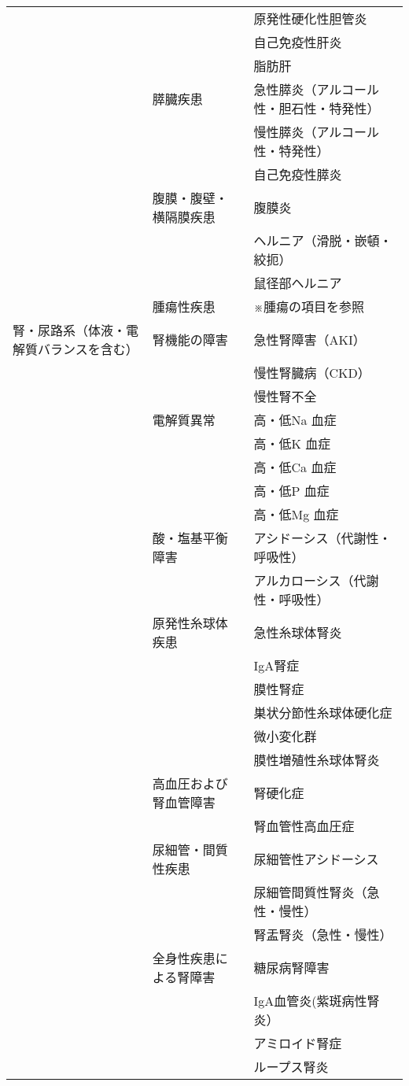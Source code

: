 \begin{xltabular}{\linewidth}{XXXX}
 &  &  & 原発性硬化性胆管炎 \\
 &  &  & 自己免疫性肝炎 \\
 &  &  & 脂肪肝 \\
 & 膵臓疾患 &  & 急性膵炎（アルコール性・胆石性・特発性） \\
 &  &  & 慢性膵炎（アルコール性・特発性） \\
 &  &  & 自己免疫性膵炎 \\
 & 腹膜・腹壁・横隔膜疾患 &  & 腹膜炎 \\
 &  &  & ヘルニア（滑脱・嵌頓・絞扼） \\
 &  &  & 鼠径部ヘルニア \\
 & 腫瘍性疾患 &  & ※腫瘍の項目を参照 \\
腎・尿路系（体液・電解質バランスを含む） & 腎機能の障害 &  & 急性腎障害（AKI） \\
 &  &  & 慢性腎臓病（CKD） \\
 &  &  & 慢性腎不全 \\
 & 電解質異常 &  & 高・低Na 血症 \\
 &  &  & 高・低K 血症 \\
 &  &  & 高・低Ca 血症 \\
 &  &  & 高・低P 血症 \\
 &  &  & 高・低Mg 血症 \\
 & 酸・塩基平衡障害 &  & アシドーシス（代謝性・呼吸性） \\
 &  &  & アルカローシス（代謝性・呼吸性） \\
 & 原発性糸球体疾患 &  & 急性糸球体腎炎 \\
 &  &  & IgA腎症 \\
 &  &  & 膜性腎症 \\
 &  &  & 巣状分節性糸球体硬化症 \\
 &  &  & 微小変化群 \\
 &  &  & 膜性増殖性糸球体腎炎 \\
 & 高血圧および腎血管障害 &  & 腎硬化症 \\
 &  &  & 腎血管性高血圧症 \\
 & 尿細管・間質性疾患 &  & 尿細管性アシドーシス \\
 &  &  & 尿細管間質性腎炎（急性・慢性） \\
 &  &  & 腎盂腎炎（急性・慢性） \\
 & 全身性疾患による腎障害 &  & 糖尿病腎障害 \\
 &  &  & IgA血管炎(紫斑病性腎炎） \\
 &  &  & アミロイド腎症 \\
 &  &  & ループス腎炎 \\

\end{xltabular}

